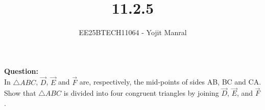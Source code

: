 \documentclass[journal]{IEEEtran}
\begin{document}

\vspace{3cm}

\title{11.2.5}
\author{EE25BTECH11064 - Yojit Manral}

\maketitle
{\let\newpage\relax\maketitle}
\renewcommand{\thefigure}{\theenumi}
\renewcommand{\thetable}{\theenumi}
\setlength{\intextsep}{10pt} %

\textbf{Question:}\\
In $\triangle ABC$, $\vec{D}$, $\vec{E}$ and $\vec{F}$ are, respectively, the mid-points of sides AB, BC and CA. Show that $\triangle ABC$ is divided into four congruent triangles by joining $\vec{D}$, $\vec{E}$, and $\vec{F}$.
\end{document}
